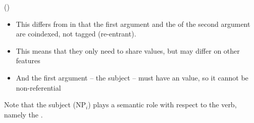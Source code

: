 \documentclass[a4paper,landscape,headrule,footrule]{foils}
\begin{document}
\begin{center} \small
{} ()\\
\end{center}

\begin{itemize}\addtolength{\itemsep}{-2ex}
\item This differs from  in that the first argument and the
    of the second argument are coindexed, not tagged (re-entrant). 
\item This means that they only need to share  values, but may
   differ on other features
\item And the first argument -- the subject -- must have an 
  value, so it cannot be non-referential
\end{itemize}


\bigskip
\begin{center}
\end{center}


Note that the subject (NP$_i$) plays a semantic role with 
respect to the verb, namely the .

\end{document}
